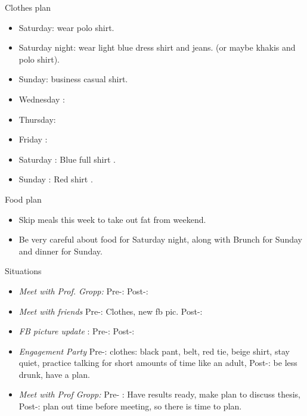 \documentclass[serif, mathserif, final]{beamer}
\begin{document}
\begin{frame}{}
\begin{columns}
\begin{column}{0.25\linewidth}
  \begin{block}{Clothes plan} 
    \begin{itemize} 
      \tiny \item \tiny Saturday: wear polo shirt. 
    \item \tiny Saturday night: wear light blue dress shirt and jeans. (or maybe khakis and polo shirt). 
    \item \tiny Sunday: business casual shirt. 
    \item \tiny Wednesday : 
    \item \tiny Thursday: 
    \item \tiny Friday : 
    \item \tiny Saturday : Blue full shirt . 
    \item \tiny Sunday : Red shirt .
    \end{itemize} 
  \end{block} 
  \begin{block}{ Food plan } 
    \begin{itemize} 
      \tiny \item \tiny Skip meals this week to take out fat from weekend. 
    \item \tiny Be very careful about food for Saturday night, along with Brunch for Sunday and dinner for Sunday. 
    \end{itemize} 
  \end{block} 
  
  \begin{block}{ Situations} 
    \begin{itemize} 

\item \tiny \textit{Meet with Prof. Gropp:}  Pre-:  Post-: 

\item \tiny \textit{Meet with friends} Pre-: Clothes, new fb pic.  Post-: 

\item \tiny \textit{FB picture update} : Pre-:  Post-: 

\item \tiny \textit{Engagement Party} Pre-: clothes: black pant, belt, red tie, beige shirt, stay quiet, practice talking for short amounts of time like an adult,  Post-: be less drunk, have a plan. 

\item \tiny \textit{Meet with Prof Gropp: } Pre- : Have results ready, make plan to discuss thesis, Post-: plan out time before meeting, so there is time to plan. 


\end{itemize}
\end{block}
\end{column}
\end{columns}
\end{frame}
\end{document}
